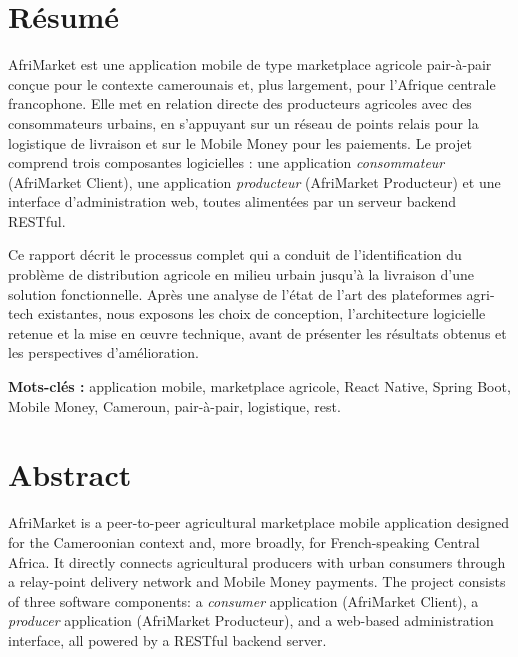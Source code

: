 \documentclass[12pt, a4paper, oneside]{report}
\begin{document}
\chapter*{Résumé}

AfriMarket est une application mobile de type marketplace agricole pair-à-pair conçue pour
le contexte camerounais et, plus largement, pour l'Afrique centrale francophone. Elle met
en relation directe des producteurs agricoles avec des consommateurs urbains, en s'appuyant
sur un réseau de points relais pour la logistique de livraison et sur le Mobile Money pour
les paiements. Le projet comprend trois composantes logicielles : une application
\emph{consommateur} (AfriMarket Client), une application \emph{producteur} (AfriMarket
Producteur) et une interface d'administration web, toutes alimentées par un serveur backend
RESTful.

Ce rapport décrit le processus complet qui a conduit de l'identification du problème de
distribution agricole en milieu urbain jusqu'à la livraison d'une solution fonctionnelle.
Après une analyse de l'état de l'art des plateformes agri-tech existantes, nous exposons
les choix de conception, l'architecture logicielle retenue et la mise en œuvre technique,
avant de présenter les résultats obtenus et les perspectives d'amélioration.

\vspace{1em}
\noindent\textbf{Mots-clés :} application mobile, marketplace agricole, React Native,
Spring Boot, Mobile Money, Cameroun, pair-à-pair, logistique, \gls{rest}.

\chapter*{Abstract}

AfriMarket is a peer-to-peer agricultural marketplace mobile application designed for the
Cameroonian context and, more broadly, for French-speaking Central Africa. It directly
connects agricultural producers with urban consumers through a relay-point delivery network
and Mobile Money payments. The project consists of three software components: a
\emph{consumer} application (AfriMarket Client), a \emph{producer} application (AfriMarket
Producteur), and a web-based administration interface, all powered by a RESTful backend
server.
\end{document}
